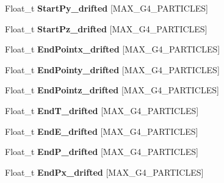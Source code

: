 \begin{DoxyCompactItemize}
\item 
\hypertarget{classanatree_ae98044c9b034d639ad6b8719779d0d01}{Float\-\_\-t {\bfseries Start\-Py\-\_\-drifted} \mbox{[}M\-A\-X\-\_\-\-G4\-\_\-\-P\-A\-R\-T\-I\-C\-L\-E\-S\mbox{]}}\label{classanatree_ae98044c9b034d639ad6b8719779d0d01}

\item 
\hypertarget{classanatree_ad1ca1198cef0185db648581298be8d18}{Float\-\_\-t {\bfseries Start\-Pz\-\_\-drifted} \mbox{[}M\-A\-X\-\_\-\-G4\-\_\-\-P\-A\-R\-T\-I\-C\-L\-E\-S\mbox{]}}\label{classanatree_ad1ca1198cef0185db648581298be8d18}

\item 
\hypertarget{classanatree_a9615bb4900d6867be708a7400b2230ab}{Float\-\_\-t {\bfseries End\-Pointx\-\_\-drifted} \mbox{[}M\-A\-X\-\_\-\-G4\-\_\-\-P\-A\-R\-T\-I\-C\-L\-E\-S\mbox{]}}\label{classanatree_a9615bb4900d6867be708a7400b2230ab}

\item 
\hypertarget{classanatree_ac7e3593a03b5af3c4df44d88a6794460}{Float\-\_\-t {\bfseries End\-Pointy\-\_\-drifted} \mbox{[}M\-A\-X\-\_\-\-G4\-\_\-\-P\-A\-R\-T\-I\-C\-L\-E\-S\mbox{]}}\label{classanatree_ac7e3593a03b5af3c4df44d88a6794460}

\item 
\hypertarget{classanatree_a217fa18cd35d47b127a0f3a64f4345b2}{Float\-\_\-t {\bfseries End\-Pointz\-\_\-drifted} \mbox{[}M\-A\-X\-\_\-\-G4\-\_\-\-P\-A\-R\-T\-I\-C\-L\-E\-S\mbox{]}}\label{classanatree_a217fa18cd35d47b127a0f3a64f4345b2}

\item 
\hypertarget{classanatree_ae38a505b83f0ea010a495284a49a2ae3}{Float\-\_\-t {\bfseries End\-T\-\_\-drifted} \mbox{[}M\-A\-X\-\_\-\-G4\-\_\-\-P\-A\-R\-T\-I\-C\-L\-E\-S\mbox{]}}\label{classanatree_ae38a505b83f0ea010a495284a49a2ae3}

\item 
\hypertarget{classanatree_abba292c36386bd9049d34a386d697c8d}{Float\-\_\-t {\bfseries End\-E\-\_\-drifted} \mbox{[}M\-A\-X\-\_\-\-G4\-\_\-\-P\-A\-R\-T\-I\-C\-L\-E\-S\mbox{]}}\label{classanatree_abba292c36386bd9049d34a386d697c8d}

\item 
\hypertarget{classanatree_a40b0455d69597943e00c689a9874e837}{Float\-\_\-t {\bfseries End\-P\-\_\-drifted} \mbox{[}M\-A\-X\-\_\-\-G4\-\_\-\-P\-A\-R\-T\-I\-C\-L\-E\-S\mbox{]}}\label{classanatree_a40b0455d69597943e00c689a9874e837}

\item 
\hypertarget{classanatree_aa1c7d9a1a958c85458dc90861d445445}{Float\-\_\-t {\bfseries End\-Px\-\_\-drifted} \mbox{[}M\-A\-X\-\_\-\-G4\-\_\-\-P\-A\-R\-T\-I\-C\-L\-E\-S\mbox{]}}\label{classanatree_aa1c7d9a1a958c85458dc90861d445445}


\end{DoxyCompactItemize}
